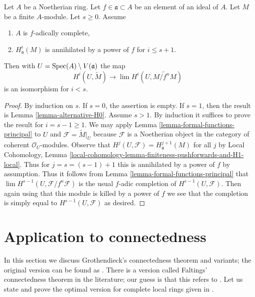 \begin{lemma}
\label{lemma-alternative-higher}
Let $A$ be a Noetherian ring. Let $f \in \mathfrak a \subset A$
be an element of an ideal of $A$. Let $M$ be a finite $A$-module.
Let $s \geq 0$. Assume
\begin{enumerate}
\item $A$ is $f$-adically complete,
\item $H^i_\mathfrak a(M)$ is annihilated by a power of $f$
for $i \leq s + 1$.
\end{enumerate}
Then with $U = \mathop{\mathrm{Spec}}(A) \setminus V(\mathfrak a)$ the map
$$
H^i(U, \widetilde{M})
\longrightarrow
\lim H^i(U, \widetilde{M/f^nM})
$$
is an isomorphism for $i < s$.
\end{lemma}

\begin{proof}
By induction on $s$. If $s = 0$, the assertion is empty. If $s = 1$, then
the result is Lemma \ref{lemma-alternative-H0}. Assume $s > 1$. By induction
it suffices to prove the result for $i = s - 1 \geq 1$.
We may apply Lemma \ref{lemma-formal-functions-principal}
to $U$ and $\mathcal{F} = \widetilde{M}|_U$
because $\mathcal{F}$ is a Noetherian object in
the category of coherent $\mathcal{O}_U$-modules.
Observe that $H^j(U, \mathcal{F}) = H^{j + 1}_\mathfrak a(M)$ for all $j$ by
Local Cohomology, Lemma
\ref{local-cohomology-lemma-finiteness-pushforwards-and-H1-local}.
Thus for $j = s = (s - 1) + 1$ this is
annihilated by a power of $f$ by assumption.
Thus it follows from
Lemma \ref{lemma-formal-functions-principal} that
$\lim H^{s - 1}(U, \mathcal{F}/f^n\mathcal{F})$
is the usual $f$-adic completion of $H^{s - 1}(U, \mathcal{F})$.
Then again using that this module is killed by a power of
$f$ we see that the completion is simply equal to $H^{s - 1}(U, \mathcal{F})$
as desired.
\end{proof}





\section{Application to connectedness}
\label{section-connected}

\noindent
In this section we discuss Grothendieck's connectedness theorem
and variants; the original version can be found as
\cite[Exposee XIII, Theorem 2.1]{SGA2}. There is a version
called Faltings' connectedness theorem in the literature;
our guess is that this refers to \cite[Theorem 6]{Faltings-some}.
Let us state and prove the optimal version for complete
local rings given in \cite[Theorem 1.6]{Varbaro}.

